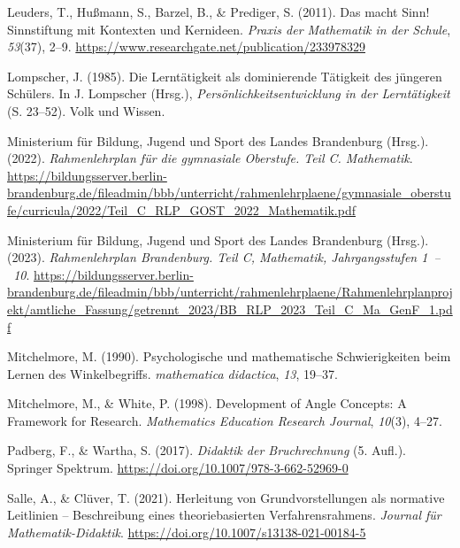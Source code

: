 \documentclass[
]{scrbook}
\newlength{\cslhangindent}
\newenvironment{CSLReferences}[2] %
 {\begin{list}{}{%
  \setlength{\itemindent}{0pt}
  \setlength{\leftmargin}{0pt}
  \setlength{\parsep}{0pt}
  \ifodd #1
   \setlength{\leftmargin}{\cslhangindent}
   \setlength{\itemindent}{-1\cslhangindent}
  \fi
  \setlength{\itemsep}{#2\baselineskip}}}
 {\end{list}}
\theoremstyle{definition}
\theoremstyle{definition}
\theoremstyle{definition}
\theoremstyle{definition}
\theoremstyle{remark}
\begin{document}
\begin{CSLReferences}{1}{0}
Leuders, T., Hußmann, S., Barzel, B., \& Prediger, S. (2011). Das macht {Sinn}! {Sinnstiftung} mit {Kontexten} und {Kernideen}. \emph{Praxis der Mathematik in der Schule}, \emph{53}(37), 2--9. \url{https://www.researchgate.net/publication/233978329}

Lompscher, J. (1985). Die {Lerntätigkeit} als dominierende {Tätigkeit} des jüngeren {Schülers}. In J. Lompscher (Hrsg.), \emph{Persönlichkeitsentwicklung in der {Lerntätigkeit}} (S. 23--52). Volk und Wissen.

Ministerium für Bildung, Jugend und Sport des Landes Brandenburg (Hrsg.). (2022). \emph{Rahmenlehrplan für die gymnasiale {Oberstufe}. {Teil} {C}. {Mathematik}}. \url{https://bildungsserver.berlin-brandenburg.de/fileadmin/bbb/unterricht/rahmenlehrplaene/gymnasiale_oberstufe/curricula/2022/Teil_C_RLP_GOST_2022_Mathematik.pdf}

Ministerium für Bildung, Jugend und Sport des Landes Brandenburg (Hrsg.). (2023). \emph{Rahmenlehrplan {Brandenburg}. {Teil} {C}, {Mathematik}, {Jahrgangsstufen} 1~--~10}. \url{https://bildungsserver.berlin-brandenburg.de/fileadmin/bbb/unterricht/rahmenlehrplaene/Rahmenlehrplanprojekt/amtliche_Fassung/getrennt_2023/BB_RLP_2023_Teil_C_Ma_GenF_1.pdf}

Mitchelmore, M. (1990). Psychologische und mathematische Schwierigkeiten beim Lernen des Winkelbegriffs. \emph{mathematica didactica}, \emph{13}, 19--37.

Mitchelmore, M., \& White, P. (1998). Development of {Angle} {Concepts}: {A} {Framework} for {Research}. \emph{Mathematics Education Research Journal}, \emph{10}(3), 4--27.

Padberg, F., \& Wartha, S. (2017). \emph{Didaktik der {Bruchrechnung}} (5. Aufl.). Springer Spektrum. \url{https://doi.org/10.1007/978-3-662-52969-0}

Salle, A., \& Clüver, T. (2021). Herleitung von {Grundvorstellungen} als normative {Leitlinien} -- {Beschreibung} eines theoriebasierten {Verfahrensrahmens}. \emph{Journal für Mathematik-Didaktik}. \url{https://doi.org/10.1007/s13138-021-00184-5}


\end{CSLReferences}
\end{document}
